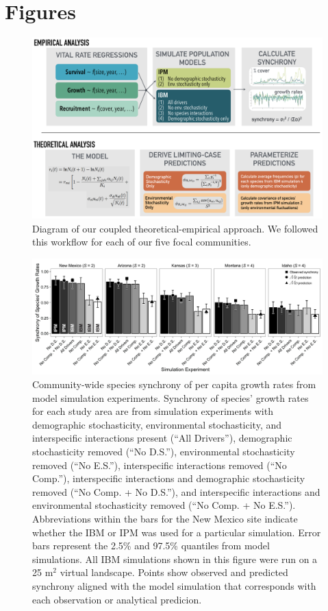 \documentclass[12pt,]{article}
\begin{document}
\pagebreak{}

\section{Figures}

\begin{figure}[!ht]
  \centering
      \includegraphics[width=6in]{./components/formatted_figures/synchrony_flowchart_bw.png}
  \caption{Diagram of our coupled theoretical-empirical approach. We followed this workflow for each of our five focal communities.}
\end{figure}

\pagebreak{}

\begin{figure}[!ht]
  \centering
      \includegraphics[width=6in]{./components/formatted_figures/formatted_figure1.png}
  \caption{Community-wide species synchrony of per capita growth rates from model simulation experiments. Synchrony of species' growth rates for each study area are from simulation experiments with demographic stochasticity, environmental stochasticity, and interspecific interactions present (``All Drivers''), demographic stochasticity removed (``No D.S.''), environmental stochasticity removed (``No E.S.''), interspecific interactions removed (``No Comp.''), interspecific interactions and demographic stochasticity removed (``No Comp. + No D.S.''), and interspecific interactions and environmental stochasticity removed (``No Comp. + No E.S.''). Abbreviations within the bars for the New Mexico site indicate whether the IBM or IPM was used for a particular simulation. Error bars represent the 2.5\% and 97.5\% quantiles from model simulations. All IBM simulations shown in this figure were run on a 25 $\text{m}^2$ virtual landscape. Points show observed and predicted synchrony aligned with the model simulation that corresponds with each observation or analytical predicion.}
\end{figure}
\end{document}
